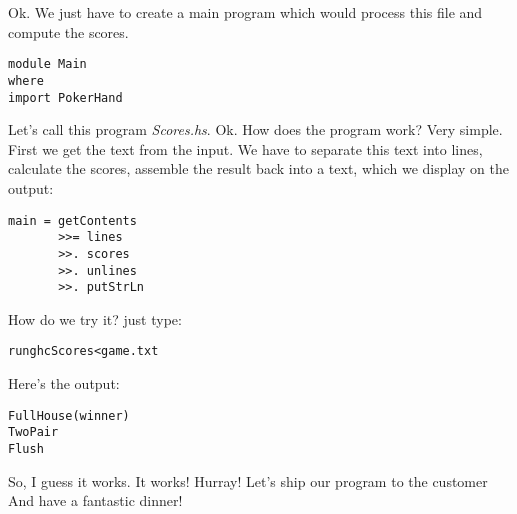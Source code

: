 \lhA Ok. We just have to create a main program which would process this file and compute the scores.

\begin{lstlisting}[frame=single] 
module Main
where
import PokerHand
\end{lstlisting}
Let's call this program \emph{Scores.hs}.
\lhN Ok. How does the program work?
\lhA Very simple. First we get the text from the input. We have to separate this text into lines, calculate the scores, assemble the result back into a text, which we display on the output: 
\begin{lstlisting}[frame=single]
main = getContents 
       >>= lines
       >>. scores
       >>. unlines
       >>. putStrLn
\end{lstlisting}
\lhN How do we try it?
\lhA just type:
\begin{alltt}
runghc Scores <game.txt
\end{alltt}
\lhN Here's the output:
\begin{alltt}
       Full House (winner)
       Two Pair
      
  
       Flush
     
\end{alltt}
So, I guess it works.
\lhA \success \success \success It works! Hurray!
\lhN Let's ship our program to the customer
\lhA And have a fantastic dinner!
\lhend



